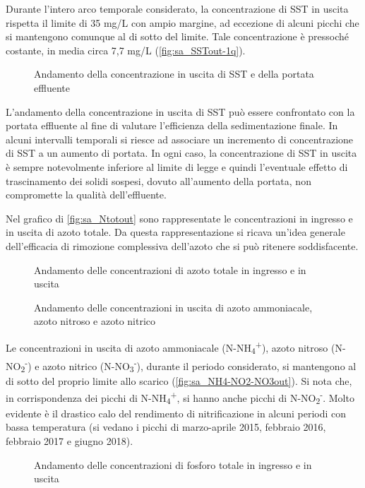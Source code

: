 Durante l’intero arco temporale considerato, la concentrazione di SST in uscita rispetta il limite di 35 mg/L con ampio margine, ad eccezione di alcuni picchi che si mantengono comunque al di sotto del limite. Tale concentrazione è pressoché costante, in media circa 7,7 mg/L (\autoref{fig:sa_SSTout-1q}).
\begin{figure}[H]
		\centering
	\caption{Andamento della concentrazione in uscita di SST e della portata effluente}
	\label{fig:sa_SSTout-1q}
\end{figure}
L'andamento della concentrazione in uscita di SST può essere confrontato con la portata effluente al fine di valutare l'efficienza della sedimentazione finale.
In alcuni intervalli temporali si riesce ad associare un incremento di concentrazione di SST a un aumento di portata. In ogni caso, la concentrazione di SST in uscita è sempre notevolmente inferiore al limite di legge e quindi l'eventuale effetto di trascinamento dei solidi sospesi, dovuto all'aumento della portata, non compromette la qualità dell'effluente.

Nel grafico di \autoref{fig:sa_Ntotout} sono rappresentate le concentrazioni in ingresso e in uscita di azoto totale.
Da questa rappresentazione si ricava un’idea generale dell’efficacia di rimozione complessiva dell’azoto che si può ritenere soddisfacente.
\begin{figure}[H]
		\centering
	\caption{Andamento delle concentrazioni di azoto totale in ingresso e in uscita}
	\label{fig:sa_Ntotout}
\end{figure}
\begin{figure}[H]
		\centering
	\caption{Andamento delle concentrazioni in uscita di azoto ammoniacale, azoto nitroso e azoto nitrico}
	\label{fig:sa_NH4-NO2-NO3out}
\end{figure}

Le concentrazioni in uscita di azoto ammoniacale (N-NH\textsubscript{4}\textsuperscript{+}), azoto nitroso (N-NO\textsubscript{2}\textsuperscript{-}) e azoto nitrico (N-NO\textsubscript{3}\textsuperscript{-}), durante il periodo considerato, si mantengono al di sotto del proprio limite allo scarico (\autoref{fig:sa_NH4-NO2-NO3out}).
Si nota che, in corrispondenza dei picchi di N-NH\textsubscript{4}\textsuperscript{+}, si hanno anche picchi di N-NO\textsubscript{2}\textsuperscript{-}. Molto evidente è il drastico calo del rendimento di nitrificazione in alcuni periodi con bassa temperatura (si vedano i picchi di marzo-aprile 2015, febbraio 2016, febbraio 2017 e giugno 2018).
\begin{figure}[H]
		\centering
	\caption{Andamento delle concentrazioni di fosforo totale in ingresso e in uscita}
	\label{fig:sa_Ptotout}
\end{figure}

